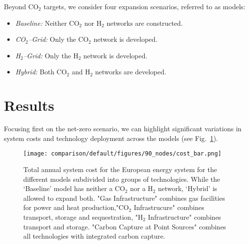 \documentclass[twocolumn]{article}
\newcommand{\carbon}{CO$_2$}
\newcommand{\hydrogen}{H$_2$}
\newcommand{\carbongrid}{\carbon{}--Grid}
\newcommand{\hydrogengrid}{\hydrogen{}--Grid}
\begin{document}
Beyond \carbon{} targets, we consider four expansion scenarios, referred to as models:
\begin{itemize}
    \item[] \textit{Baseline:} Neither \carbon{} nor \hydrogen{} networks are constructed.
    \item[] \textit{\carbongrid:} Only the \carbon{} network is developed.
    \item[] \textit{\hydrogengrid:} Only the \hydrogen{} network is developed.
    \item[] \textit{Hybrid:} Both \carbon{} and \hydrogen{} networks are developed.
\end{itemize}



\section{Results}
\label{sec:results}


Focusing first on the net-zero scenario, we can highlight significant variations in system costs and technology deployment across the models (see Fig.~\ref{fig:cost_bar}).

\begin{figure}[ht!]
    \centering
    \texttt{[image: comparison/default/figures/90\_nodes/cost\_bar.png]}
    \caption[short]{Total annual system cost for the European energy system for the different models subdivided into groups of technologies. While the `Baseline' model has neither a \carbon{} nor a \hydrogen{} network, `Hybrid' is allowed to expand both. "Gas Infrastructure" combines gas facilities for power and heat production,"\carbon{} Infrastrucure" combines transport, storage and sequestration, "H$_2$ Infrastructure" combines transport and storage. "Carbon Capture at Point Sources" combines all technologies with integrated carbon capture.}
    \label{fig:cost_bar}
\end{figure}
\end{document}

